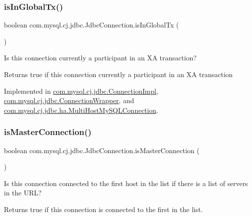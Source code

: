 \subsubsection{\texorpdfstring{is\+In\+Global\+Tx()}{isInGlobalTx()}}
{\footnotesize\ttfamily boolean com.\+mysql.\+cj.\+jdbc.\+Jdbc\+Connection.\+is\+In\+Global\+Tx (\begin{DoxyParamCaption}{ }\end{DoxyParamCaption})}

Is this connection currently a participant in an XA transaction?

\begin{DoxyReturn}{Returns}
true if this connection currently a participant in an XA transaction 
\end{DoxyReturn}


Implemented in \mbox{\hyperlink{classcom_1_1mysql_1_1cj_1_1jdbc_1_1_connection_impl_a36d32f1c890a8774776f435a8d7a9f55}{com.\+mysql.\+cj.\+jdbc.\+Connection\+Impl}}, \mbox{\hyperlink{classcom_1_1mysql_1_1cj_1_1jdbc_1_1_connection_wrapper_a939c7730de2849e54b9b121adb1cdaa3}{com.\+mysql.\+cj.\+jdbc.\+Connection\+Wrapper}}, and \mbox{\hyperlink{classcom_1_1mysql_1_1cj_1_1jdbc_1_1ha_1_1_multi_host_my_s_q_l_connection_a12a895a23d45e4ac2df69fed6c022fef}{com.\+mysql.\+cj.\+jdbc.\+ha.\+Multi\+Host\+My\+S\+Q\+L\+Connection}}.

\mbox{\label{interfacecom_1_1mysql_1_1cj_1_1jdbc_1_1_jdbc_connection_a012dc133872dd4d6db6d6f98118d3251}} 
\subsubsection{\texorpdfstring{is\+Master\+Connection()}{isMasterConnection()}}
{\footnotesize\ttfamily boolean com.\+mysql.\+cj.\+jdbc.\+Jdbc\+Connection.\+is\+Master\+Connection (\begin{DoxyParamCaption}{ }\end{DoxyParamCaption})}

Is this connection connected to the first host in the list if there is a list of servers in the U\+RL?

\begin{DoxyReturn}{Returns}
true if this connection is connected to the first in the list. 
\end{DoxyReturn}


